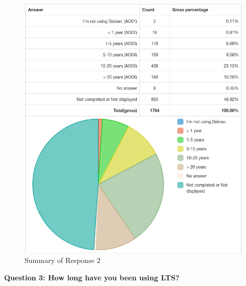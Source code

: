 \documentclass{article}
\begin{document}
\vspace{3mm}
\begin{figure}[h!]
\centering
\includegraphics[width=16.5cm]{assets/2-summary.png}
\caption{Summary of Response 2}
\end{figure}

\newpage

\Large{\textbf{Question 3: How long have you been using LTS?}}
\end{document}

